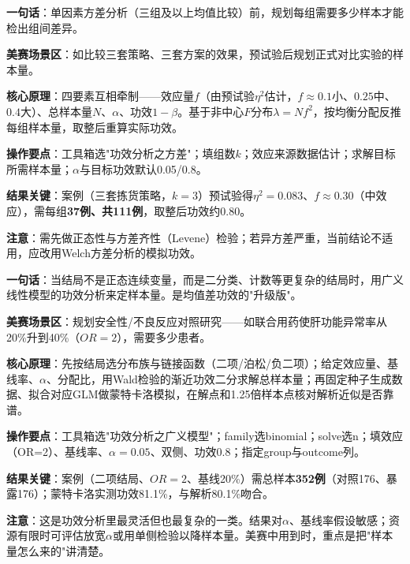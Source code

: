 \begin{algobrief}
\textbf{一句话}：单因素方差分析（三组及以上均值比较）前，规划每组需要多少样本才能检出组间差异。

\textbf{美赛场景区}：如比较三套策略、三套方案的效果，预试验后规划正式对比实验的样本量。

\textbf{核心原理}：四要素互相牵制——效应量$f$（由预试验$\eta^2$估计，$f\approx0.1$小、$0.25$中、$0.4$大）、总样本量$N$、$\alpha$、功效$1-\beta$。基于非中心$F$分布$\lambda=N f^2$，按均衡分配反推每组样本量，取整后重算实际功效。

\textbf{操作要点}：工具箱选"功效分析之方差"；填组数$k$；效应来源数据估计；求解目标所需样本量；$\alpha$与目标功效默认0.05/0.8。

\textbf{结果关键}：案例（三套拣货策略，$k=3$）预试验得$\eta^2=0.083$、$f\approx0.30$（中效应），需每组\textbf{37例、共111例}，取整后功效约0.80。

\textbf{注意}：需先做正态性与方差齐性（Levene）检验；若异方差严重，当前结论不适用，应改用Welch方差分析的模拟功效。
\end{algobrief}


\begin{algobrief}
\textbf{一句话}：当结局不是正态连续变量，而是二分类、计数等更复杂的结局时，用广义线性模型的功效分析来定样本量。是均值差功效的"升级版"。

\textbf{美赛场景区}：规划安全性/不良反应对照研究——如联合用药使肝功能异常率从20\%升到40\%（$OR=2$），需要多少患者。

\textbf{核心原理}：先按结局选分布族与链接函数（二项/泊松/负二项）；给定效应量、基线率、$\alpha$、分配比，用Wald检验的渐近功效二分求解总样本量；再固定种子生成数据、拟合对应GLM做蒙特卡洛模拟，在解点和1.25倍样本点核对解析近似是否靠谱。

\textbf{操作要点}：工具箱选"功效分析之广义模型"；family选binomial；solve选n；填效应（OR=2）、基线率、$\alpha=0.05$、双侧、功效0.8；指定group与outcome列。

\textbf{结果关键}：案例（二项结局、$OR=2$、基线20\%）需总样本\textbf{352例}（对照176、暴露176）；蒙特卡洛实测功效81.1\%，与解析80.1\%吻合。

\textbf{注意}：这是功效分析里最灵活但也最复杂的一类。结果对$\alpha$、基线率假设敏感；资源有限时可评估放宽$\alpha$或用单侧检验以降样本量。美赛中用到时，重点是把"样本量怎么来的"讲清楚。
\end{algobrief}
